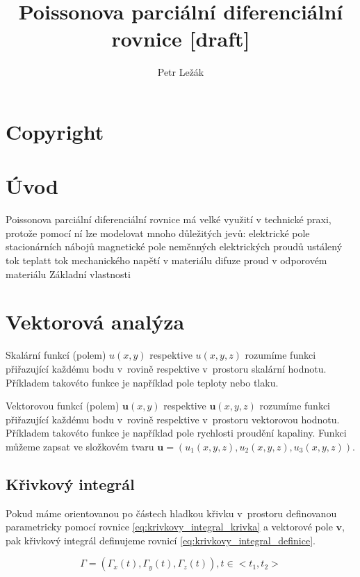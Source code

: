 \documentclass{book}
\title{Poissonova parciální diferenciální rovnice [draft]}
\author{Petr Ležák}
\newcommand{\vect}[1]{\boldsymbol{#1}}
\begin{document}
\maketitle

\section{Copyright}



\section{Úvod}

Poissonova parciální diferenciální rovnice má velké využití v technické praxi, protože pomocí ní lze modelovat mnoho důležitých jevů:
elektrické pole stacionárních nábojů
magnetické pole neměnných elektrických proudů
ustálený tok teplatt
tok mechanického napětí v materiálu
difuze
proud v odporovém materiálu
Základní vlastnosti

\section{Vektorová analýza}

Skalární funkcí (polem) \(u(x, y)\) respektive \(u(x, y, z)\) rozumíme funkci přiřazující každému bodu v~rovině respektive v~prostoru skalární hodnotu. Příkladem takovéto funkce je například pole teploty nebo tlaku.


Vektorovou funkcí (polem) \(\vect{u}(x, y)\) respektive \(\vect{u}(x, y, z)\) rozumíme funkci přiřazující každému bodu v~rovině respektive v~prostoru vektorovou hodnotu. Příkladem takovéto funkce je například pole rychlosti proudění kapaliny. Funkci můžeme zapsat ve složkovém tvaru \(\vect{u}=(u_1(x, y, z), u_2(x, y, z), u_3(x, y, z))\).

\subsection{Křivkový integrál}
Pokud máme orientovanou po částech hladkou křivku v~prostoru definovanou parametricky pomocí rovnice \eqref{eq:krivkovy_integral_krivka} a vektorové pole \(\vect{v}\), pak křivkový integrál definujeme rovnicí \eqref{eq:krivkovy_integral_definice}.

\begin{equation}
\label{eq:krivkovy_integral_krivka}
\Gamma = (\Gamma_x(t), \Gamma_y(t), \Gamma_z(t)), t \in <t_1, t_2>
\end{equation}
\end{document}
